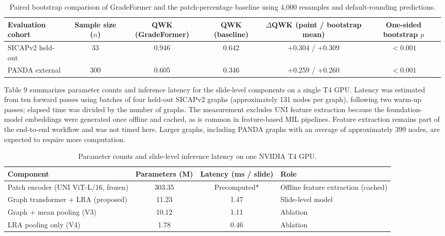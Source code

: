 \documentclass[11pt,a4paper]{article}
\begin{document}
\begin{table}[H]
\centering
\small
\setlength{\tabcolsep}{4pt}
\renewcommand{\arraystretch}{1.15}
\caption{Paired bootstrap comparison of GradeFormer and the patch-percentage baseline using 4,000 resamples and default-rounding predictions.}
\label{tab:bootstrap_significance}
\begin{tabularx}{\textwidth}{p{2.8cm}CCCCC}
\toprule
\textbf{Evaluation cohort} & \textbf{Sample size ($n$)} & \textbf{QWK (GradeFormer)} & \textbf{QWK (baseline)} & \textbf{$\Delta$QWK (point / bootstrap mean)} & \textbf{One-sided bootstrap $p$} \\
\midrule
SICAPv2 held-out & 33 & 0.946 & 0.642 & +0.304 / +0.309 & $< 0.001$ \\
PANDA external & 300 & 0.605 & 0.346 & +0.259 / +0.260 & $< 0.001$ \\
\bottomrule
\end{tabularx}
\end{table}

Table 9 summarizes parameter counts and inference latency for the slide-level components on a single T4 GPU. Latency was estimated from ten forward passes using batches of four held-out SICAPv2 graphs (approximately 131 nodes per graph), following two warm-up passes; elapsed time was divided by the number of graphs. The measurement excludes UNI feature extraction because the foundation-model embeddings were generated once offline and cached, as is common in feature-based MIL pipelines. Feature extraction remains part of the end-to-end workflow and was not timed here. Larger graphs, including PANDA graphs with an average of approximately 399 nodes, are expected to require more computation.


\begin{table}[H]
\centering
\small
\renewcommand{\arraystretch}{1.15}
\caption{Parameter counts and slide-level inference latency on one NVIDIA T4 GPU.}
\label{tab:parameter_latency}
\begin{tabularx}{\textwidth}{lCcX}
\toprule
\textbf{Component} & \textbf{Parameters (M)} & \textbf{Latency (ms / slide)} & \textbf{Role} \\
\midrule
Patch encoder (UNI ViT-L/16, frozen) & 303.35 & Precomputed* & Offline feature extraction (cached) \\
Graph transformer + LRA (proposed) & 11.23 & 1.47 & Slide-level model \\
Graph + mean pooling (V3) & 10.12 & 1.11 & Ablation \\
LRA pooling only (V4) & 1.78 & 0.46 & Ablation \\
\bottomrule
\end{tabularx}
\end{table}
\end{document}

